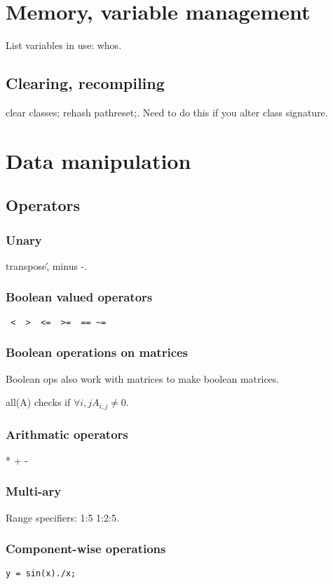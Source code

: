 \documentclass[oneside, article]{memoir}
\begin{document}
\section{Memory, variable management}
List variables in use: whos.

\subsection{Clearing, recompiling}
clear classes; rehash pathreset;. Need to do this if you alter class signature.

\section{Data manipulation}
\subsection{Operators}
\subsubsection{Unary}
transpose\', minus -.

\subsubsection{Boolean valued operators}
\begin{verbatim}
 <  >  <=  >=  == ~=
\end{verbatim}

\subsubsection{Boolean operations on matrices}
Boolean ops also work with matrices to make boolean matrices.

all(A) checks if $\forall i,j A_{i,j} \neq 0$.

\subsubsection{Arithmatic operators}
* + -

\subsubsection{Multi-ary}
Range specifiers: 1:5 1:2:5.

\subsubsection{Component-wise operations}
\begin{verbatim}
y = sin(x)./x;
\end{verbatim}
\end{document}
